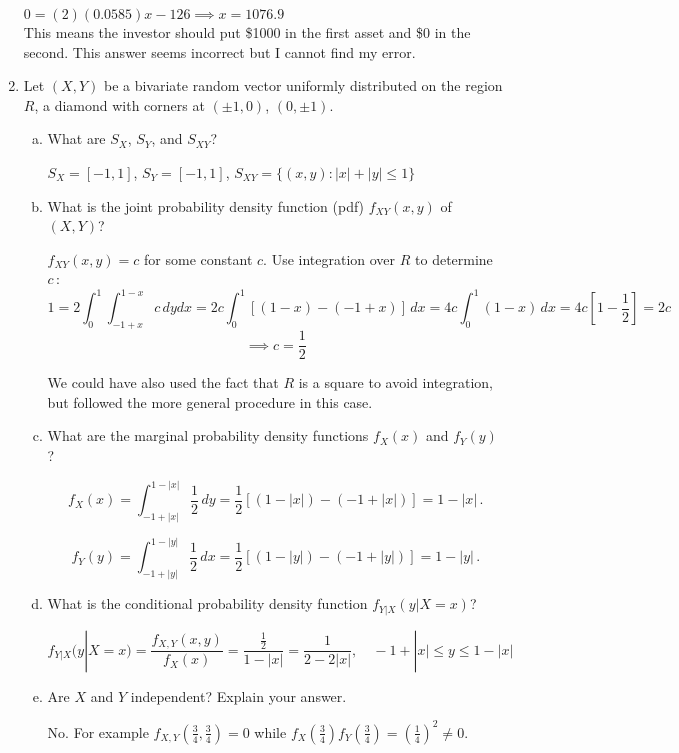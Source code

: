 \documentclass[letterpaper,12pt,fleqn]{article}
\begin{document}
\begin{enumerate}
$0 = (2)(0.0585)x - 126 \implies x = 1076.9$ \\

This means the investor should put \$1000 in the first asset and \$0 in the second. This answer seems incorrect but I cannot find my error.

\item Let $(X, Y)$ be a bivariate random vector uniformly distributed on the region $R$, a diamond with corners at $(\pm1, 0)$, $(0, \pm1)$.



\vspace{1em}

\begin{enumerate}[(a)]
\item What are $S_X$, $S_Y$, and $S_{XY}$?

$S_X = [-1,1]$, $S_Y = [-1,1]$, $S_{XY} = \{(x,y) : |x|+|y| \leq 1\}$

\item What is the joint probability density function (pdf) $f_{XY}(x, y)$ of $(X, Y)$?

$f_{XY} (x,y)=c$ for some constant $c$. Use integration over $R$ to determine $c\,$:
$$ 1 = 2\int_{0}^{1} \int_{-1+x}^{1-x} c \, dydx = 2c\int_{0}^{1} [(1-x)-(-1+x)] \, dx = 4c \int_{0}^{1} (1-x) \, dx = 4c[1-\frac{1}{2}] = 2c$$ $$\implies c = \frac{1}{2}$$

We could have also used the fact that $R$ is a square to avoid integration, but followed the more general procedure in this case. \\

\item What are the marginal probability density functions $f_{X}(x)$ and $f_{Y}(y)$?

$$f_{X}(x) = \int_{-1+|x|}^{1-|x|} \frac{1}{2} \, dy=  \frac{1}{2} [(1-|x|)-(-1+|x|)] = 1-|x| \,.$$

$$f_{Y}(y) = \int_{-1+|y|}^{1-|y|} \frac{1}{2} \, dx=  \frac{1}{2} [(1-|y|)-(-1+|y|)] = 1-|y| \,.$$

\item What is the conditional probability density function $f_{Y|X}(y | X = x)$?

$$f_{Y|X}(y | X = x) = \frac{f_{X,Y}(x,y)}{f_X(x)} = \frac{\frac{1}{2}}{1-|x|} = \frac{1}{2-2|x|}, \quad
-1+|x| \leq y \leq 1 - |x| $$

\item Are $X$ and $Y$ independent? Explain your answer.

No. For example $f_{X,Y} (\frac{3}{4},\frac{3}{4})=0$ while $f_X(\frac{3}{4})f_Y(\frac{3}{4}) = (\frac{1}{4})^2 \neq 0$.


\end{enumerate}
\end{enumerate}
\end{document}
